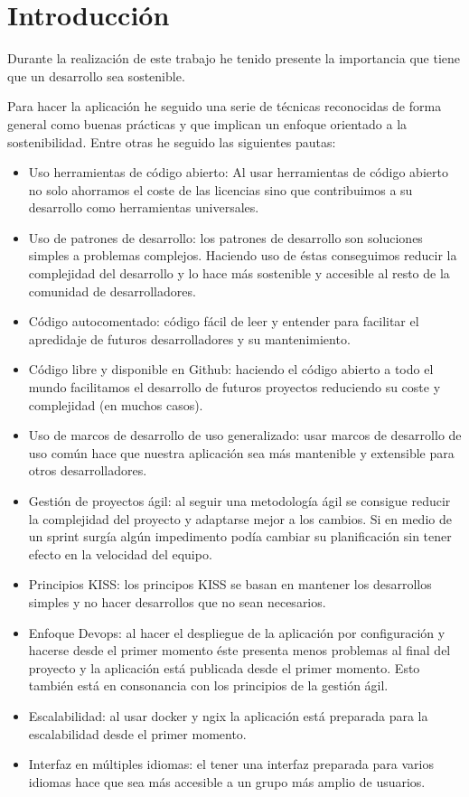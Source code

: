 
\section{Introducción}
Durante la realización de este trabajo he tenido presente la importancia 
que tiene que un desarrollo sea sostenible.

Para hacer la aplicación he seguido una serie de técnicas reconocidas de forma 
general como buenas prácticas y que implican un enfoque orientado a la sostenibilidad.
Entre otras he seguido las siguientes pautas:
\begin{itemize}
    \item Uso herramientas de código abierto: Al usar herramientas de código abierto no solo 
          ahorramos el coste de las licencias sino que contribuimos a su desarrollo como herramientas universales. 
    \item Uso de patrones de desarrollo: los patrones de desarrollo son soluciones simples 
          a problemas complejos. Haciendo uso de éstas conseguimos reducir 
          la complejidad del desarrollo y lo hace más sostenible y 
          accesible al resto de la comunidad de desarrolladores. 
    \item Código autocomentado: código fácil de leer y entender para facilitar el 
            apredidaje de futuros desarrolladores y su mantenimiento.
    \item Código libre y disponible en Github: haciendo el código abierto a todo el mundo facilitamos 
            el desarrollo de futuros proyectos reduciendo su coste y complejidad (en muchos casos). 
    \item Uso de marcos de desarrollo de uso generalizado: usar marcos de desarrollo de uso común hace 
            que nuestra aplicación sea más mantenible y extensible para otros desarrolladores.
    \item Gestión de proyectos ágil: al seguir una metodología ágil se consigue reducir la complejidad del 
        proyecto y adaptarse mejor a los cambios. Si en medio de un sprint surgía algún impedimento 
        podía cambiar su planificación sin tener efecto en la velocidad del equipo. 
    \item Principios KISS: los principos KISS se basan en mantener los desarrollos simples y 
        no hacer desarrollos que no sean necesarios.
    \item Enfoque Devops: al hacer el despliegue de la aplicación por configuración y hacerse desde el 
        primer momento éste presenta menos problemas al final del proyecto y la aplicación está publicada 
        desde el primer momento. Esto también está en consonancia con los principios de la gestión ágil. 
    \item Escalabilidad: al usar docker y ngix la aplicación está preparada para la escalabilidad desde el primer momento.
    \item Interfaz en múltiples idiomas: el tener una interfaz preparada para varios idiomas hace que sea más 
        accesible a un grupo más amplio de usuarios.
\end{itemize}

